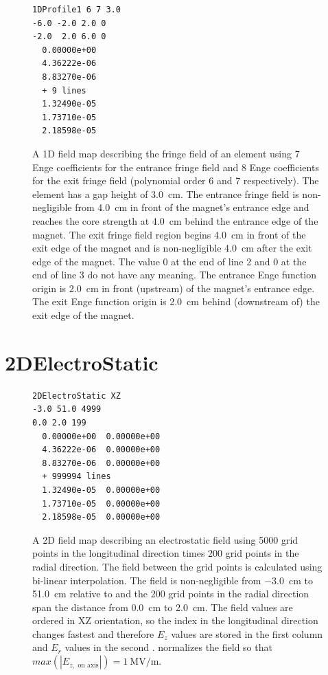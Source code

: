 \begin{figure}[h]
  \begin{fmpage}
\begin{verbatim}
1DProfile1 6 7 3.0
-6.0 -2.0 2.0 0
-2.0  2.0 6.0 0
  0.00000e+00
  4.36222e-06
  8.83270e-06
  + 9 lines
  1.32490e-05
  1.73710e-05
  2.18598e-05
\end{verbatim}
\end{fmpage}
\caption[Example of a 1DProfile1 Type 2 field map]{A 1D field map describing the fringe field of an element using 7 Enge coefficients for the entrance fringe field and 8 Enge coefficients for the exit fringe field (polynomial order 6 and 7 respectively). The element has a gap height of \SI{3.0}{\centi\meter}. The entrance fringe field is non-negligible from \SI{4.0}{\centi\meter} in front of the magnet's entrance edge and reaches the core strength at \SI{4.0}{\centi\meter} behind the entrance edge of the magnet. The exit fringe field region begins \SI{4.0}{\centi\meter} in front of the exit edge of the magnet and is non-negligible \SI{4.0}{\centi\meter} after the exit edge of the magnet. The value 0 at the end of line 2 and 0 at the end of line 3 do not have any meaning. The entrance Enge function origin is \SI{2.0}{\centi\meter} in front (upstream) of the magnet's entrance edge. The exit Enge function origin is \SI{2.0}{\centi\meter} behind (downstream of) the exit edge of the magnet.}
\label{fig:1DProfile1Type2}
\end{figure}

\clearpage


\section{2DElectroStatic}
\label{sec:2DElectroStatic}
\begin{figure}[h]
  \begin{fmpage}
\begin{verbatim}
2DElectroStatic XZ
-3.0 51.0 4999
0.0 2.0 199
  0.00000e+00  0.00000e+00
  4.36222e-06  0.00000e+00
  8.83270e-06  0.00000e+00
  + 999994 lines
  1.32490e-05  0.00000e+00
  1.73710e-05  0.00000e+00
  2.18598e-05  0.00000e+00
\end{verbatim}
  \end{fmpage}
  \caption[Example of a 2DElectroStatic field map]{A 2D field map describing an electrostatic field using 5000 grid points
    in the longitudinal direction times 200 grid points in the radial direction. The field between the grid points is calculated
    using bi-linear interpolation. The field is non-negligible from \SI{-3.0}{\centi\meter} to \SI{51.0}{\centi\meter} relative to  and the 200
    grid points in the radial direction span the distance from \SI{0.0}{\centi\meter} to \SI{2.0}{\centi\meter}. The field values are ordered in XZ
    orientation, so the index in the longitudinal direction changes fastest and therefore $E_z$ values are stored in the first
    column and $E_r$ values in the second . \opalt normalizes the field so that $max(|E_{z, \text{ on axis}}|) = \SI{1}{\mega\volt\per\meter}$.}
  \label{fig:2DElectroStatic}
\end{figure}

